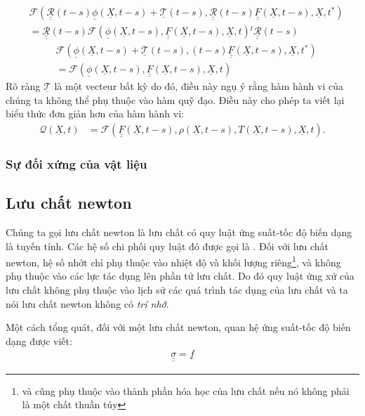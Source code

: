 \documentclass[../../../main.tex]{subfiles}
\begin{document}
		\begin{equation}
			\begin{aligned}
				&\mathcal{F}\left(\underline{\underline{\mathcal{R}}}\left(t-s\right)\underline{\phi}\left(\underline{X},t-s\right)+\underline{\mathcal{T}}\left(t-s\right),\underline{\underline{\mathcal{R}}}\left(t-s\right)\underline{\underline{F}}\left(\underline{X},t-s\right),\underline{X},t^*\right)\\
				&=\underline{\underline{\mathcal{R}}}\left(t-s\right)\mathcal{F}\left(\underline{\phi}\left(\underline{X},t-s\right),\underline{\underline{F}}\left(\underline{X},t-s\right),\underline{X},t\right){}^t\underline{\underline{\mathcal{R}}}\left(t-s\right)
			\end{aligned}
		\end{equation}
		\begin{equation}
			\begin{aligned}
				&\mathcal{F}\left(\underline{\phi}\left(\underline{X},t-s\right)+\underline{\mathcal{T}}\left(t-s\right),\left(t-s\right)\underline{\underline{F}}\left(\underline{X},t-s\right),\underline{X},t^*\right)\\
				&=\mathcal{F}\left(\underline{\phi}\left(\underline{X},t-s\right),\underline{\underline{F}}\left(\underline{X},t-s\right),\underline{X},t\right)
			\end{aligned}
		\end{equation}
	Rõ ràng $\underline{\mathcal{T}}$ là một vecteur bất kỳ do đó, điều này ngụ ý rằng hàm hành vi của chúng ta không thể phụ thuộc vào hàm quỹ đạo. Điều này cho phép ta viết lại biểu thức đơn giản hơn của hàm hành vi:
		\begin{align}
			\mathcal{Q}\left(\underline{X},t\right)&=\mathcal{F}\left(\underline{\underline{F}}\left(\underline{X},t-s\right),\rho\left(\underline{X},t-s\right),T\left(\underline{X},t-s\right),\underline{X},t\right).
		\end{align}
\subsubsection{Sự đối xứng của vật liệu}
	
\subsection{Lưu chất newton}
    Chúng ta gọi lưu chất newton là lưu chất có quy luật ứng suất-tốc độ biến dạng là tuyến tính. Các hệ số chi phối quy luật đó được gọi là . Đối với lưu chất newton, hệ số nhớt chỉ phụ thuộc vào nhiệt độ và khối lượng riêng\footnote{và cũng phụ thuộc vào thành phần hóa học của lưu chất nếu nó không phải là một chất thuần túy}, và không phụ thuộc vào các lực tác dụng lên phần tử lưu chất. Do đó quy luật ứng xử của lưu chất không phụ thuộc vào lịch sử các quá trình tác dụng của lưu chất và ta nói lưu chất newton không có \emph{trí nhớ}.

    Một cách tổng quát, đối với một lưu chất newton, quan hệ ứng suất-tốc độ biến dạng được viết:
        \begin{align}
            \underline{\underline{\sigma}}=\underline{f}
        \end{align}
\end{document}
